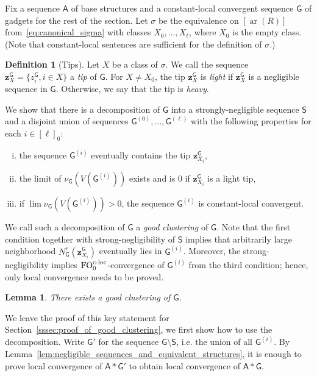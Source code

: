 \documentclass[11pt]{article}
\theoremstyle{plain}
\newtheorem{lemma}[theorem]{Lemma}
\theoremstyle{definition}
\newtheorem{definition}{Definition}
\theoremstyle{remark}
\DeclareMathOperator\aritysym{ar}
\newcommand{\arity}[1]{{\aritysym({#1})}}
\DeclareMathOperator\FO{FO}
\newcommand{\FOcloc}[1]{\FO_{#1}^{\textnormal{c-loc}}}
\newcommand{\strseq}[1]{{\boldsymbol{\mathsf{#1}}}}
\newcommand{\seq}[1]{{\mathsf{#1}}}
\newcommand{\tpl}[1]{{\bm{#1}}}
\begin{document}
Fix a sequence $\strseq{A}$ of base structures and a constant-local convergent sequence $\strseq{G}$ of gadgets for the rest of the section.
Let $\sigma$ be the equivalence on $[\arity{R}]$ from~\eqref{eq:canonical_sigma} with classes $X_0, \dots, X_\ell$, where $X_0$ is the empty class.
(Note that constant-local sentences are sufficient for the definition of $\sigma$.)

\begin{definition}[Tips]
    Let $X$ be a class of $\sigma$.
    We call the sequence $\tpl{z}^\strseq{G}_X = \{z^\strseq{G}_i, i \in X\}$ a \emph{tip} of $\strseq{G}$.
    For $X \not= X_0$, the tip $\tpl{z}^\strseq{G}_X$ is \emph{light} if $\tpl{z}^\strseq{G}_X$ is a negligible sequence in $\strseq{G}$.
    Otherwise, we say that the tip is \emph{heavy}.
\end{definition}

We show that there is a decomposition of $\strseq{G}$ into a strongly-negligible sequence $\seq{S}$ and a disjoint union of sequences $\strseq{G}^{(0)}, \dots, \strseq{G}^{(\ell)}$ with the following properties for each $i \in [\ell]_0$:
\begin{enumerate}[(i)]
    \item the sequence $\strseq{G}^{(i)}$ eventually contains the tip $\tpl{z}^\strseq{G}_{X_i}$,
    \item the limit of $\nu_\strseq{G}(V(\strseq{G}^{(i)}))$ exists and is $0$ if $\tpl{z}^\strseq{G}_{X_i}$ is a light tip,
    \item if $\lim \nu_\strseq{G}(V(\strseq{G}^{(i)})) > 0$, the sequence $\strseq{G}^{(i)}$ is constant-local convergent.
\end{enumerate}
We call such a decomposition of $\strseq{G}$ a \emph{good clustering} of $\strseq{G}$.
Note that the first condition together with strong-negligibility of $\seq{S}$ implies that arbitrarily large neighborhood $N^r_\strseq{G}(\tpl{z}^\strseq{G}_{X_i})$ eventually lies in $\strseq{G}^{(i)}$.
Moreover, the strong-negligibility implies $\FOcloc{0}$-convergence of $\strseq{G}^{(i)}$ from the third condition; hence, only local convergence needs to be proved.

\begin{lemma}\label{lem:existence_of_good_clustering}
    There exists a good clustering of $\strseq{G}$.
\end{lemma}

We leave the proof of this key statement for Section~\ref{sssec:proof_of_good_clustering}, we first show how to use the decomposition.
Write $\strseq{G}'$ for the sequence $\strseq{G} \setminus \seq{S}$, i.e. the union of all $\strseq{G}^{(i)}$.
By Lemma~\ref{lem:negligible_sequences_and_equivalent_structures}, it is enough to prove local convergence of $\strseq{A}*\strseq{G}'$ to obtain local convergence of $\strseq{A}*\strseq{G}$.
\end{document}
